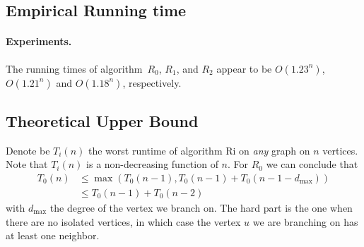 \documentclass{tufte-handout}
\begin{document}
\subsection{Empirical Running time}

\paragraph{Experiments.}

\medskip

\noindent
{}

The running times of algorithm~$R_0$, $R_1$, and $R_2$ appear to be
$O(1.23^n)$, $O(1.21^n)$ and $O(1.18^n)$, respectively.

\subsection{Theoretical Upper Bound}

Denote be $T_i(n)$ the worst runtime of algorithm Ri on \emph{any} graph on $n$ vertices.
Note that $T_i(n)$ is a non-decreasing function of $n$.
For $R_0$ we can conclude that
\begin{align*}
T_0(n) &\leq\max(T_0(n-1), T_0(n-1)+T_0(n-1-d_{\mbox{max}})) \\ &\leq T_0(n-1)+T_0(n-2)
\end{align*}
with $d_{\mbox{max}}$ the degree of the vertex we branch on. The hard part is the one when there are no isolated vertices, in which case the vertex $u$ we are branching on has at least one neighbor. 
\end{document}
